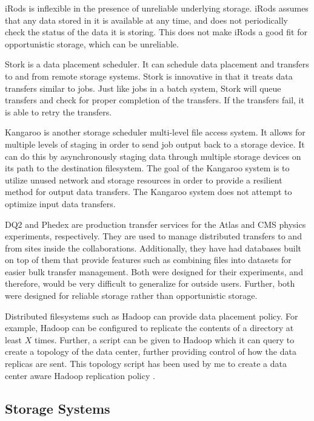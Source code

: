 iRods is inflexible in the presence of unreliable underlying storage.  iRods assumes that any data stored in it is available at any time, and does not periodically check the status of the data it is storing.  This does not make iRods a good fit for opportunistic storage, which can be unreliable.  

Stork \cite{kosar2004stork} is a data placement scheduler.  It can schedule data placement and transfers to and from remote storage systems.  Stork is innovative in that it treats data transfers similar to jobs.  Just like jobs in a batch system, Stork will queue transfers and check for proper completion of the transfers.  If the transfers fail, it is able to retry the transfers.

Kangaroo \cite{thain2001kangaroo} is another storage scheduler multi-level file access system.  It allows for multiple levels of staging in order to send job output back to a storage device.  It can do this by asynchronously staging data through multiple storage devices on its path to the destination filesystem.  The goal of the Kangaroo system is to utilize unused network and storage resources in order to provide a resilient method for output data transfers.  The Kangaroo system does not attempt to optimize input data transfers.


DQ2 \cite{branco2008managing} and Phedex \cite{rehn2006phedex} are production transfer services for the Atlas and CMS physics experiments, respectively.  They are used to manage distributed transfers to and from sites inside the collaborations.  Additionally, they have had databases built on top of them that provide features such as combining files into datasets for easier bulk transfer management.  Both were designed for their experiments, and therefore, would be very difficult to generalize for outside users.  Further, both were designed for reliable storage rather than opportunistic storage.

Distributed filesystems such as Hadoop can provide data placement policy.  For example, Hadoop can be configured to replicate the contents of a directory at least $X$ times.  Further, a script can be given to Hadoop which it can query to create a topology of the data center, further providing control of how the data replicas are sent.  This topology script has been used by me to create a data center aware Hadoop replication policy \cite{he2012hog}.

\subsection{Storage Systems}

